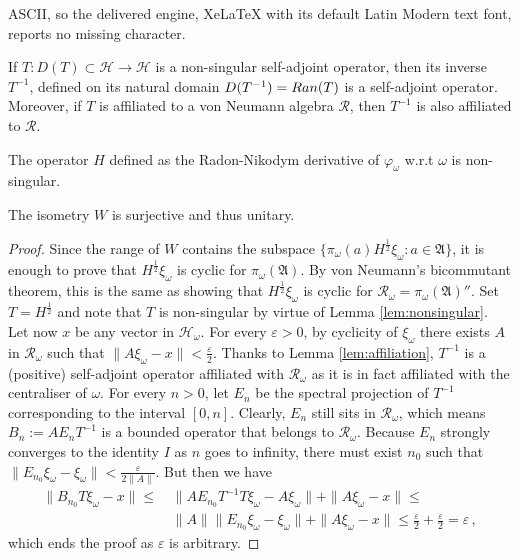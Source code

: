 \documentclass[10pt,a4paper]{amsart}
\def\ch{{\mathcal H}}
\def\ga{{\mathfrak A}} \def\gpa{{\mathfrak a}}
\def\om{\omega} \def\Om{\Omega}
\begin{document}
ASCII, so the delivered engine, XeLaTeX with its default Latin Modern text font, reports no missing character.
\begin{lem}
\label{lem:affiliation}
If $T: D(T)\subset \ch\rightarrow\ch$ is a non-singular self-adjoint operator, then its inverse
$T^{-1}$, defined on its natural domain $D(T^{-1})={\rm Ran}(T)$ is a self-adjoint operator.
Moreover, if $T$ is affiliated to a von Neumann algebra $\mathcal{R}$, then $T^{-1}$ is also
affiliated to $\mathcal{R}$.
\end{lem}

\begin{lem}
\label{lem:nonsingular}
The operator $H$ defined as the Radon-Nikodym derivative of $\varphi_\om$ w.r.t $\om$ is non-singular.
\end{lem}

\begin{prop}
\label{prop:isom}
The isometry $W$ is surjective and thus unitary. 
\end{prop}

\begin{proof}
Since the range of $W$ contains the subspace $\{\pi_\om(a) H^\frac{1}{2}\xi_\om: a\in\ga\}$, it is enough
to prove that $H^\frac{1}{2}\xi_\om$ is cyclic for $\pi_\om(\ga)$. By von Neumann's bicommutant theorem, this is the same as 
showing that  $H^\frac{ 1}{2}\xi_\om$ is cyclic for $\mathcal{R}_\om= \pi_\om(\ga)''$. Set $T=H^\frac{1}{2}$ and note 
that $T$ is non-singular by virtue of Lemma \ref{lem:nonsingular}.\\
Let now $x$ be any vector in $\ch_\om$. For every $\varepsilon >0$, by cyclicity of
$\xi_\om$ there exists
$A$ in $\mathcal{R}_\om$ such that $\|A\xi_\om- x \|<\frac{\varepsilon}{2}$.
Thanks to Lemma \ref{lem:affiliation}, $T^{-1}$ is a (positive) self-adjoint operator affiliated with $\mathcal{R}_\om$ as it is in fact affiliated with the centraliser of $\om$. For every $n>0$, let $E_n$ be the spectral
projection of $T^{-1}$ corresponding to the interval $[0, n]$. Clearly, $E_n$ still sits in 
$\mathcal{R}_\om$, which means $B_n:=AE_nT^{-1}$ is a bounded operator that belongs to $\mathcal{R}_\om$.
Because $E_n$ strongly converges to the identity $I$ as $n$ goes to infinity, there must exist $n_0$ such that
$\|E_{n_0}\xi_\om- \xi_\om\|<\frac{\varepsilon}{2\|A\|}$.
But then we have
\begin{align*}
\|B_{n_0}T\xi_\om- x\|\leq&\,\|AE_{n_0}T^{-1}T\xi_\om- A\xi_\om\|+\|A\xi_\om-x\| \leq\\
 &\,\|A\|\|E_{n_0}\xi_\om- \xi_\om\|+\|A\xi_\om-x\| \leq \frac{\varepsilon}{2}+\frac{\varepsilon}{2}=\varepsilon\,,
\end{align*}
which ends the proof as  $\varepsilon$ is arbitrary.
\end{proof}
\end{document}
